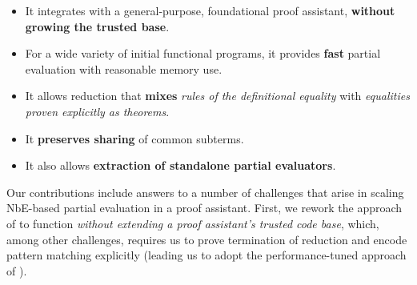 \documentclass[sigplan,10pt,review,anonymous]{acmart}\settopmatter{printfolios=true,printccs=false,printacmref=false}
\begin{document}
\begin{itemize}
\item It integrates with a general-purpose, foundational proof assistant, \textbf{without growing the trusted base}.
\item For a wide variety of initial functional programs, it provides \textbf{fast} partial evaluation with reasonable memory use.
\item It allows reduction that \textbf{mixes} \emph{rules of the definitional equality} with \emph{equalities proven explicitly as theorems}.
\item It \textbf{preserves sharing} of common subterms.
\item It also allows \textbf{extraction of standalone partial evaluators}.
\end{itemize}

Our contributions include answers to a number of challenges that arise in scaling NbE-based partial evaluation in a proof assistant.
First, we rework the approach of \citet{Aehlig} to function \emph{without extending a proof assistant's trusted code base}, which, among other challenges, requires us to prove termination of reduction and encode pattern matching explicitly (leading us to adopt the performance-tuned approach of \citet{maranget2008compiling}).
\end{document}
